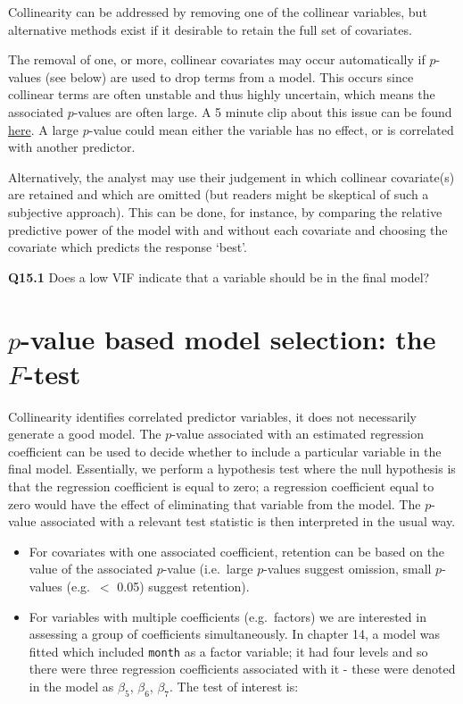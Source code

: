 \documentclass[
  oneside]{krantz}
\begin{document}
Collinearity can be addressed by removing one of the collinear variables, but alternative methods exist if it desirable to retain the full set of covariates.

The removal of one, or more, collinear covariates may occur automatically if \(p\)-values (see below) are used to drop terms from a model. This occurs since collinear terms are often unstable and thus highly uncertain, which means the associated \(p\)-values are often large. A 5 minute clip about this issue can be found \href{http://www.youtube.com/watch?v=O4jDva9B3fw}{here}.
A large \(p\)-value could mean either the variable has no effect, or is correlated with another predictor.

Alternatively, the analyst may use their judgement in which collinear covariate(s) are retained and which are omitted (but readers might be skeptical of such a subjective approach). This can be done, for instance, by comparing the relative predictive power of the model with and without each covariate and choosing the covariate which predicts the response `best'.

\textbf{Q15.1} Does a low VIF indicate that a variable should be in the final model?

\hypertarget{p-value-based-model-selection-the-f-test}{%
\section{\texorpdfstring{\(p\)-value based model selection: the \(F\)-test}{p-value based model selection: the F-test}}\label{p-value-based-model-selection-the-f-test}}

Collinearity identifies correlated predictor variables, it does not necessarily generate a good model. The \(p\)-value associated with an estimated regression coefficient can be used to decide whether to include a particular variable in the final model. Essentially, we perform a hypothesis test where the null hypothesis is that the regression coefficient is equal to zero; a regression coefficient equal to zero would have the effect of eliminating that variable from the model. The \(p\)-value associated with a relevant test statistic is then interpreted in the usual way.

\begin{itemize}
\item
  For covariates with one associated coefficient, retention can be based on the value of the associated \(p\)-value (i.e.~large \(p\)-values suggest omission, small \(p\)-values (e.g.~\(<\) 0.05) suggest retention).
\item
  For variables with multiple coefficients (e.g.~factors) we are interested in assessing a group of coefficients simultaneously. In chapter 14, a model was fitted which included \texttt{month} as a factor variable; it had four levels and so there were three regression coefficients associated with it - these were denoted in the model as \(\beta_5\), \(\beta_6\), \(\beta_7\). The test of interest is:
\end{itemize}
\end{document}
